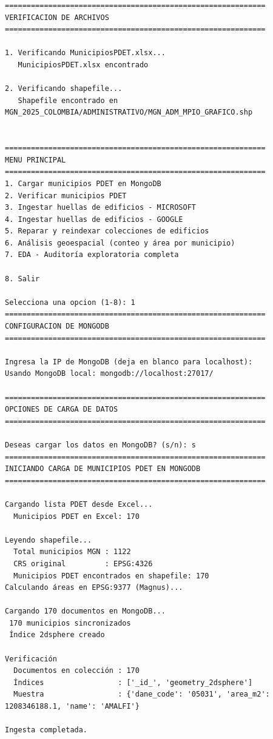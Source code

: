 \documentclass[12pt,a4paper]{article}
\begin{document}
\begin{lstlisting}[style=evidence]
============================================================
VERIFICACION DE ARCHIVOS
============================================================

1. Verificando MunicipiosPDET.xlsx...
   MunicipiosPDET.xlsx encontrado

2. Verificando shapefile...
   Shapefile encontrado en MGN_2025_COLOMBIA/ADMINISTRATIVO/MGN_ADM_MPIO_GRAFICO.shp


============================================================
MENU PRINCIPAL
============================================================
1. Cargar municipios PDET en MongoDB
2. Verificar municipios PDET
3. Ingestar huellas de edificios - MICROSOFT
4. Ingestar huellas de edificios - GOOGLE
5. Reparar y reindexar colecciones de edificios
6. Análisis geoespacial (conteo y área por municipio)
7. EDA - Auditoría exploratoria completa

8. Salir

Selecciona una opcion (1-8): 1
============================================================
CONFIGURACION DE MONGODB
============================================================

Ingresa la IP de MongoDB (deja en blanco para localhost): 
Usando MongoDB local: mongodb://localhost:27017/

============================================================
OPCIONES DE CARGA DE DATOS
============================================================

Deseas cargar los datos en MongoDB? (s/n): s
============================================================
INICIANDO CARGA DE MUNICIPIOS PDET EN MONGODB
============================================================

Cargando lista PDET desde Excel...
  Municipios PDET en Excel: 170

Leyendo shapefile...
  Total municipios MGN : 1122
  CRS original         : EPSG:4326
  Municipios PDET encontrados en shapefile: 170
Calculando áreas en EPSG:9377 (Magnus)...

Cargando 170 documentos en MongoDB...
 170 municipios sincronizados
 Índice 2dsphere creado

Verificación
  Documentos en colección : 170
  Índices                 : ['_id_', 'geometry_2dsphere']
  Muestra                 : {'dane_code': '05031', 'area_m2': 1208346188.1, 'name': 'AMALFI'}

Ingesta completada.


\end{lstlisting}
\end{document}
